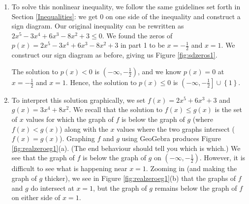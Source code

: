 {\begin{enumerate}
\item To solve this nonlinear inequality, we follow the same guidelines set forth in Section \ref{Inequalities}:  we get $0$ on one side of the inequality and construct a sign diagram.  Our original inequality can be rewritten as $2x^5-3x^4+6x^3-8x^2+3 \leq 0$.  We found the zeros of $p(x) = 2x^5-3x^4+6x^3-8x^2+3$ in part 1 to be $x=-\frac{1}{2}$ and $x=1$. We construct our sign diagram as before, giving us Figure \ref{fig:sdzeros1}.

{}

The solution to $p(x) < 0$ is $\left(-\infty, -\frac{1}{2}\right)$, and we know $p(x) = 0$ at $x=-\frac{1}{2}$ and $x=1$.  Hence, the solution to $p(x) \leq 0$ is $\left(-\infty, -\frac{1}{2}\right] \cup \left\{1\right\}$.  


\item To interpret this solution graphically, we set $f(x) = 2x^5+6x^3+3$ and $g(x) = 3x^4+8x^2$.  We recall that the solution to $f(x) \leq g(x)$ is the set of $x$ values for which the graph of $f$ is below the graph of $g$ (where $f(x) < g(x)$) along with the $x$ values where the two graphs intersect ($f(x) = g(x)$).  Graphing $f$ and $g$ using GeoGebra produces Figure \ref{fig:realzeroeg1}(a).  (The end behaviour should tell you which is which.)  We see that the graph of $f$ is below the graph of $g$ on $\left(-\infty, -\frac{1}{2}\right)$. However, it is difficult to see what is happening near $x=1$.  Zooming in (and making the graph of $g$ thicker), we see in Figure \ref{fig:realzeroeg1}(b) that the graphs of $f$ and $g$ do intersect at $x=1$, but the graph of $g$ remains below the graph of $f$ on either side of $x = 1$.

\end{enumerate}
}

{
}

